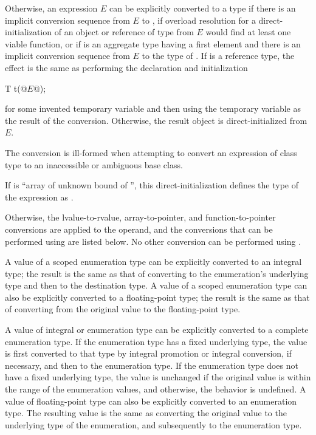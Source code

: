 \pnum
Otherwise, an expression $E$ can be explicitly converted to a type 
if there is an implicit conversion sequence
from $E$ to ,
if overload resolution for a direct-initialization
of an object or reference of type  from $E$
would find at least one viable function, or
if  is an aggregate type
having a first element  and
there is an implicit conversion sequence
from $E$ to the type of .
If  is a reference type, the effect is
the same as performing the declaration and initialization
\begin{codeblock}
T t(@$E$@);
\end{codeblock}
for some invented temporary variable 
and then using the temporary variable as the result of the conversion.
Otherwise, the result object is direct-initialized from $E$.
\begin{note}
The conversion is ill-formed when attempting to convert an
expression of class type to an inaccessible or ambiguous base class.
\end{note}
\begin{note}
If  is ``array of unknown bound of '',
this direct-initialization defines the type of the expression as .
\end{note}

\pnum
Otherwise, the lvalue-to-rvalue,
array-to-pointer, and
function-to-pointer conversions are applied to the
operand, and the conversions that can be performed using  are listed below.
No other conversion can be performed using .

\pnum
A value of a scoped enumeration type
can be explicitly converted to an integral type;
the result is the same as that of converting
to the enumeration's underlying type and then to the destination type.
A value of a scoped enumeration type
can also be explicitly converted to a floating-point type;
the result is the same as that of converting
from the original value to the floating-point type.

\pnum
{}%
%
A value of integral or enumeration type can be explicitly converted to
a complete enumeration type.
If the enumeration type has a fixed underlying type,
the value is first converted to that type
by
integral promotion or integral conversion,
if necessary, and
then to the enumeration type.
If the enumeration type does not have a fixed underlying type,
the value is unchanged
if the original value is within the range
of the enumeration values, and
otherwise, the behavior is undefined.
A value of floating-point type can also be explicitly converted to an enumeration type.
The resulting value is the same as converting the original value to the
underlying type of the enumeration, and subsequently to
the enumeration type.


